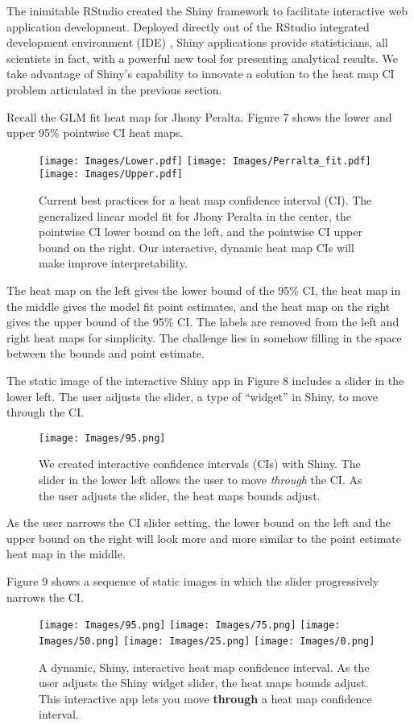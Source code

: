 The inimitable RStudio created the Shiny framework to facilitate interactive web application development. Deployed directly out of the RStudio integrated development environment (IDE) \citep{IDE}, Shiny applications provide statisticians, all scientists in fact, with a powerful new tool for presenting analytical results. We take advantage of Shiny's capability to innovate a solution to the heat map CI problem articulated in the previous section.

Recall the GLM fit heat map for Jhony Peralta. Figure 7 shows the lower and upper 95\% pointwise CI heat maps.

  \begin{figure}[H]
	\centering
	\texttt{[image: Images/Lower.pdf]}
	\texttt{[image: Images/Perralta\_fit.pdf]}
	\texttt{[image: Images/Upper.pdf]}
	\caption{Current best practices for a heat map confidence interval (CI). The generalized linear model fit for Jhony Peralta in the center, the pointwise CI lower bound on the left, and the pointwise CI upper bound on the right. Our interactive, dynamic heat map CIs will make improve interpretability.}
	\end{figure}
The heat map on the left gives the lower bound of the 95\% CI, the heat map in the middle gives the model fit point estimates, and the heat map on the right gives the upper bound of the 95\% CI. The labels are removed from the left and right heat maps for simplicity. The challenge lies in somehow filling in the space between the bounds and point estimate.

The static image of the interactive Shiny app in Figure 8 includes a slider in the lower left. The user adjusts the slider, a type of ``widget'' in Shiny, to move through the CI.

  \begin{figure}[H]
	\centering
	\texttt{[image: Images/95.png]}
	\caption{We created interactive confidence intervals (CIs) with Shiny. The slider in the lower left allows the user to move {\it through} the CI. As the user adjusts the slider, the heat maps bounds adjust.}
	\end{figure}

As the user narrows the CI slider setting, the lower bound on the left and the upper bound on the right will look more and more similar to the point estimate heat map in the middle.

Figure 9 shows a sequence of static images in which the slider progressively narrows the CI.
  \begin{figure}[H]
	\centering
	\texttt{[image: Images/95.png]}
	\texttt{[image: Images/75.png]}
	\texttt{[image: Images/50.png]}
	\texttt{[image: Images/25.png]}
	\texttt{[image: Images/0.png]}
	\caption{A dynamic, Shiny, interactive heat map confidence interval. As the user adjusts the Shiny widget slider, the heat maps bounds adjust. This interactive app lets you move {\bf through} a heat map confidence interval.}
	\end{figure}

